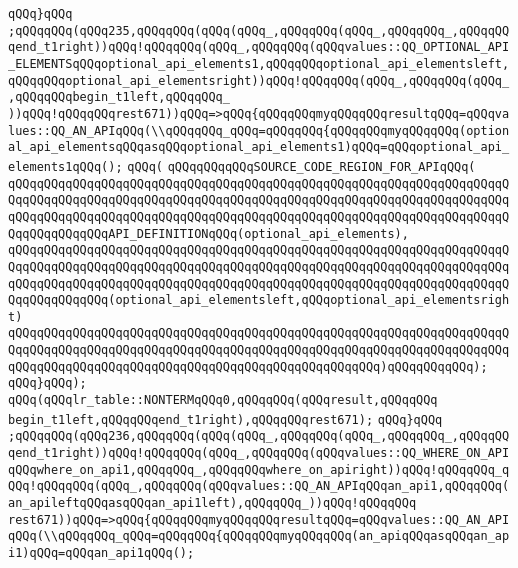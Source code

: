 \verb|qQQq}qQQq|\newline
\verb|;qQQqqQQq(qQQq235,qQQqqQQq(qQQq(qQQq_,qQQqqQQq(qQQq_,qQQqqQQq_,qQQqqQQqend_t1right))qQQq!qQQqqQQq(qQQq_,qQQqqQQq(qQQqvalues::QQ_OPTIONAL_API_ELEMENTSqQQqoptional_api_elements1,qQQqqQQqoptional_api_elementsleft,qQQqqQQqoptional_api_elementsright))qQQq!qQQqqQQq(qQQq_,qQQqqQQq(qQQq_,qQQqqQQqbegin_t1left,qQQqqQQq_|\newline
\verb|))qQQq!qQQqqQQqrest671))qQQq=>qQQq{qQQqqQQqmyqQQqqQQqresultqQQq=qQQqvalues::QQ_AN_APIqQQq(\\qQQqqQQq_qQQq=qQQqqQQq{qQQqqQQqmyqQQqqQQq(optional_api_elementsqQQqasqQQqoptional_api_elements1)qQQq=qQQqoptional_api_elements1qQQq();|\newline
\verb|qQQq(|\newline
\verb|qQQqqQQqqQQqSOURCE_CODE_REGION_FOR_APIqQQq(|\newline
\verb|qQQqqQQqqQQqqQQqqQQqqQQqqQQqqQQqqQQqqQQqqQQqqQQqqQQqqQQqqQQqqQQqqQQqqQQqqQQqqQQqqQQqqQQqqQQqqQQqqQQqqQQqqQQqqQQqqQQqqQQqqQQqqQQqqQQqqQQqqQQqqQQqqQQqqQQqqQQqqQQqqQQqqQQqqQQqqQQqqQQqqQQqqQQqqQQqqQQqqQQqqQQqqQQqqQQqqQQqqQQqqQQqAPI_DEFINITIONqQQq(optional_api_elements),|\newline
\verb|qQQqqQQqqQQqqQQqqQQqqQQqqQQqqQQqqQQqqQQqqQQqqQQqqQQqqQQqqQQqqQQqqQQqqQQqqQQqqQQqqQQqqQQqqQQqqQQqqQQqqQQqqQQqqQQqqQQqqQQqqQQqqQQqqQQqqQQqqQQqqQQqqQQqqQQqqQQqqQQqqQQqqQQqqQQqqQQqqQQqqQQqqQQqqQQqqQQqqQQqqQQqqQQqqQQqqQQqqQQqqQQq(optional_api_elementsleft,qQQqoptional_api_elementsright)|\newline
\verb|qQQqqQQqqQQqqQQqqQQqqQQqqQQqqQQqqQQqqQQqqQQqqQQqqQQqqQQqqQQqqQQqqQQqqQQqqQQqqQQqqQQqqQQqqQQqqQQqqQQqqQQqqQQqqQQqqQQqqQQqqQQqqQQqqQQqqQQqqQQqqQQqqQQqqQQqqQQqqQQqqQQqqQQqqQQqqQQqqQQqqQQqqQQqqQQq)qQQqqQQqqQQq);|\newline
\verb|qQQq}qQQq);|\newline
\verb|qQQq(qQQqlr_table::NONTERMqQQq0,qQQqqQQq(qQQqresult,qQQqqQQq|\newline
\verb|begin_t1left,qQQqqQQqend_t1right),qQQqqQQqrest671);|\newline
\verb|qQQq}qQQq|\newline
\verb|;qQQqqQQq(qQQq236,qQQqqQQq(qQQq(qQQq_,qQQqqQQq(qQQq_,qQQqqQQq_,qQQqqQQqend_t1right))qQQq!qQQqqQQq(qQQq_,qQQqqQQq(qQQqvalues::QQ_WHERE_ON_APIqQQqwhere_on_api1,qQQqqQQq_,qQQqqQQqwhere_on_apiright))qQQq!qQQqqQQq_qQQq!qQQqqQQq(qQQq_,qQQqqQQq(qQQqvalues::QQ_AN_APIqQQqan_api1,qQQqqQQq(an_apileftqQQqasqQQqan_api1left),qQQqqQQq_))qQQq!qQQqqQQq|\newline
\verb|rest671))qQQq=>qQQq{qQQqqQQqmyqQQqqQQqresultqQQq=qQQqvalues::QQ_AN_APIqQQq(\\qQQqqQQq_qQQq=qQQqqQQq{qQQqqQQqmyqQQqqQQq(an_apiqQQqasqQQqan_api1)qQQq=qQQqan_api1qQQq();|\newline
